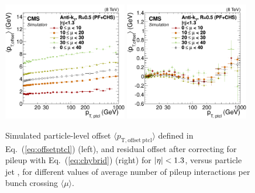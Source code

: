 \documentclass[11pt,twoside,a4paper,cmspaper,final,collab]{cms-tdr}
\begin{document}
\begin{figure}[htbp!]
\includegraphics[width=0.48\textwidth]{Figure_005-a.pdf}
\includegraphics[width=0.48\textwidth]{Figure_005-b.pdf}
\caption{\label{fig:offset}
Simulated particle-level offset $\langle p_\mathrm{T, offset~ptcl}\rangle$ defined in Eq.~(\ref{eq:offsetptcl}) (left), and residual offset after correcting for pileup with Eq.~(\ref{eq:chybrid}) (right) for $\lvert \eta \rvert<1.3$, versus particle jet \pt, for different values of average number of pileup interactions per bunch crossing $\langle\mu\rangle$.
}
\end{figure}
\end{document}
